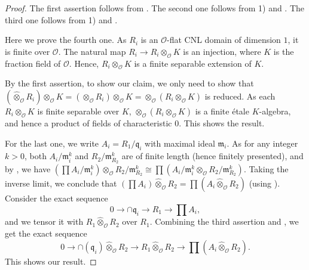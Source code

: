 \documentclass[a4paper, 12pt]{amsart}
\newcommand{\cO}{\mathcal{O}}
\newcommand{\kq}{\mathfrak{q}}
\newcommand{\kp}{\mathfrak{p}}
\newcommand{\km}{\mathfrak{m}}
\begin{document}
	\begin{proof}
		The first assertion follows from \cite[Lemma 1.3]{Thorne_2014}. The second one follows from 1) and \cite[Lemma 1.4]{Thorne_2014}. The third one follows from 1) and \cite[Lemma 4.2.4]{pan2022fontaine}.
		
		Here we prove the fourth one. As $R_i$ is an $\cO$-flat CNL domain of dimension $1$, it is finite over $\cO$. The natural map $R_i \to R_i \otimes_\cO K$ is an injection, where $K$ is the fraction field of $\cO$. Hence, $R_i \otimes_\cO K $ is a finite separable extension of $K$.
		
		By the first assertion, to show our claim, we only need to show that $({\widehat{\otimes}_\cO} R_i) \otimes_\cO K = ({\otimes}_\cO R_i) \otimes_\cO K = \otimes_\cO (R_i \otimes_\cO K)$ is reduced. As each $R_i \otimes_\cO K $ is finite separable over $K$, $\otimes_\cO (R_i \otimes_\cO K)$ is a finite \'etale $K$-algebra, and hence a product of fields of characteristic $0$. This shows the result.
		
		
		
		For the last one, we write $A_i= R_1/\kq_i$ with maximal ideal $\km_i$.  As for any integer $k>0$, both $A_i/\km_i^k$ and $R_2/\km_{R_2}^k$ are of finite length (hence finitely presented), and by \cite[Lemma 10.89.3]{stacks-project}, we have $(\prod A_i/\km_i^k) \otimes_{\cO} R_2/\km_{R_2}^k \cong \prod (A_i/\km_i^k \otimes_{\cO} R_2/\km_{R_2}^k) $. Taking the inverse limit, we conclude that $(\prod A_i)\widehat{\otimes}_\cO R_2 = \prod(A_i \widehat{\otimes}_\cO R_2)$ (using \cite[Lemma 4.14.10]{stacks-project}). Consider the exact sequence
		$$ 0 \to \cap \kq_i \to R_1 \to \prod A_i,$$
		and we tensor it with $R_1 \widehat{\otimes}_\cO R_2 $ over $R_1$.
		Combining the third assertion and \cite[Lemma 4.2.4 (1) \& (2)]{pan2022fontaine}, we get the exact sequence
		$$ 0 \to \cap (\kq_i) \widehat{\otimes}_\cO R_2 \to R_1 \widehat{\otimes}_\cO R_2 \to \prod(A_i \widehat{\otimes}_\cO R_2).$$
		This shows our result.
	\end{proof}
	
\end{document}
